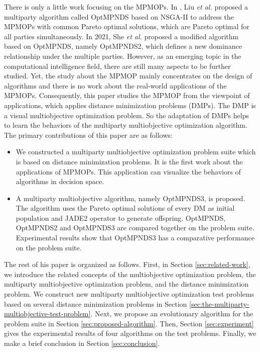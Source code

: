 \documentclass[preprint,12pt]{elsarticle}
\begin{document}
There is only a little work focusing on the MPMOPs.
In \cite{liu2020evolutionary}, Liu \textit{et al.}  proposed a multiparty algorithm called OptMPNDS based on NSGA-II \cite{deb2002fast} to address the MPMOPs with common Pareto optimal solutions, which are Pareto optimal for all parties simultaneously.
In 2021, She \textit{et al.} \cite{she2021new} proposed a modified algorithm based on OptMPNDS, namely OptMPNDS2, which defines a new dominance relationship under the multiple parties.
However, as an emerging topic in the computational intelligence field, there are still many aspects to be further studied.
Yet, the study about the MPMOP mainly concentrates on the design of algorithms and there is no work about the real-world applications of the MPMOPs.
Consequently, this paper studies the MPMOP from the viewpoint of applications, which applies distance minimization problems (DMPs).
The DMP is a visual multiobjective optimization problem.
So the adaptation of DMPs helps to learn the behaviors of the multiparty multiobjective optimization algorithm.
The primary contributions of this paper are as follows:
\begin{itemize}
	\item 	We constructed a multiparty multiobjective optimization problem suite which is based on distance minimization problems. It is the first work about the applications of MPMOPs. This application can visualize the behaviors of algorithms in decision space.
	\item 	A multiparty multiobjective algorithm, namely OptMPNDS3, is proposed. The algorithm uses the Pareto optimal solutions of every DM as initial population and JADE2 operator to generate offspring. OptMPNDS, OptMPNDS2 and OptMPNDS3 are compared together on the problem suite.
	      Experimental results show that OptMPNDS3 has a comparative performance on the problem suite.
\end{itemize}

The rest of his paper is organized as follows.
First, in Section \ref{sec:related-work}, we introduce the related concepts of the multiobjective optimization problem, the multiparty multiobjective optimization problem, and the distance minimization problem.
We construct new multiparty multiobjective optimization test problems based on several distance minimization problems in Section \ref{sec:the-multiparty-multiobjective-test-problem}.
Next, we propose an evolutionary algorithm for the problem suite in Section \ref{sec:proposed-algorithm}.
Then, Section \ref{sec:experiment} gives the experimental results of four algorithms on the test problems.
Finally, we make a brief conclusion in Section \ref{sec:conclusion}.
\end{document}
